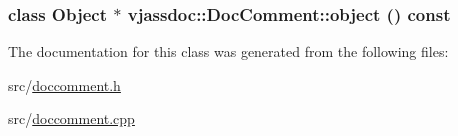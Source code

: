 \hypertarget{classvjassdoc_1_1DocComment_057c80a5fd3a3c7d776483feaf51a8a8}{
\subsubsection{\setlength{\rightskip}{0pt plus 5cm}class {\bf Object} $\ast$ vjassdoc::DocComment::object () const}}
\label{classvjassdoc_1_1DocComment_057c80a5fd3a3c7d776483feaf51a8a8}




The documentation for this class was generated from the following files:\begin{CompactItemize}
\item 
src/\hyperlink{doccomment_8h}{doccomment.h}\item 
src/\hyperlink{doccomment_8cpp}{doccomment.cpp}\end{CompactItemize}
